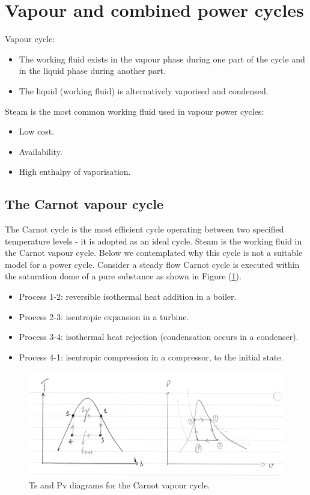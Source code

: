 \documentclass[class=report, crop=false, 12pt,a4paper]{standalone}
\begin{document}
\section{Vapour and combined power cycles}
Vapour cycle:
\begin{itemize}[noitemsep]
  \item The working fluid exists in the vapour phase during one part of the cycle and in the liquid phase during another part.
  \item The liquid (working fluid) is alternatively vaporised and condensed.
\end{itemize}
Steam is the most common working fluid used in vapour power cycles:
\begin{itemize}[noitemsep]
  \item Low cost.
  \item Availability.
  \item High enthalpy of vaporisation.
\end{itemize}
\subsection{The Carnot vapour cycle}
The Carnot cycle is the most efficient cycle operating between two specified temperature levels - it is adopted as an ideal cycle. Steam is the working fluid in the Carnot vapour cycle. Below we contemplated why this cycle is not a suitable model for a power cycle. Consider a steady flow Carnot cycle is executed within the saturation dome of a pure substance as shown in Figure (\ref{CarnotVapourCycle}). 
\begin{itemize}[noitemsep]
  \item Process 1-2: reversible isothermal heat addition in a boiler. 
  \item Process 2-3: isentropic expansion in a turbine.
  \item Process 3-4: isothermal heat rejection (condensation occurs in a condenser).
  \item Process 4-1: isentropic compression in a compressor, to the initial state.
\end{itemize}
\begin{figure}
  \centering
  \includegraphics[width = 0.8 \textwidth]{../img/CarnotVapourCycleTSPV}
  \caption{Ts and Pv diagrams for the Carnot vapour cycle.}
  \label{CarnotVapourCycle}
\end{figure}
\end{document}
